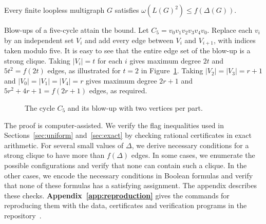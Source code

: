 \begin{theorem}\label{thm:multigraph}
Every finite loopless multigraph $G$ satisfies
$\omega(L(G)^2)\leq f(\Delta(G))$.
\end{theorem}

Blow-ups of a five-cycle attain the bound. Let $C_5=v_0v_1v_2v_3v_4v_0$. Replace each $v_i$ by an independent set $V_i$ and add every edge between $V_i$ and $V_{i+1}$, with indices taken modulo five. It is easy to see that the entire edge set of the blow-up is a strong clique. Taking $|V_i|=t$ for each $i$ gives
maximum degree $2t$ and $5t^2=f(2t)$ edges, as illustrated for
$t=2$ in Figure~\ref{fig:blowup}. Taking $|V_2|=|V_3|=r+1$ and
$|V_0|=|V_1|=|V_4|=r$ gives maximum degree $2r+1$ and
$5r^2+4r+1=f(2r+1)$ edges, as required.

\begin{figure}[!htbp]
\centering
{}
\caption{The cycle $C_5$ and its blow-up with two vertices per part.}
\label{fig:blowup}
\end{figure}

The proof is computer-assisted. We verify the flag inequalities used
in Sections~\ref{sec:uniform} and~\ref{sec:exact} by checking rational
certificates in exact arithmetic. For several small values of $\Delta$,
we derive necessary conditions for a strong clique to have more than
$f(\Delta)$ edges. In some cases, we enumerate the possible configurations
and verify that none can contain such a clique. In the other cases, we
encode the necessary conditions in Boolean formulas and verify that
none of these formulas has a satisfying assignment. The appendix describes
these checks. \textbf{Appendix~\ref{app:reproduction}} gives the commands
for reproducing them with the data, certificates and verification programs
in the repository~\cite{FGSTCode}.

